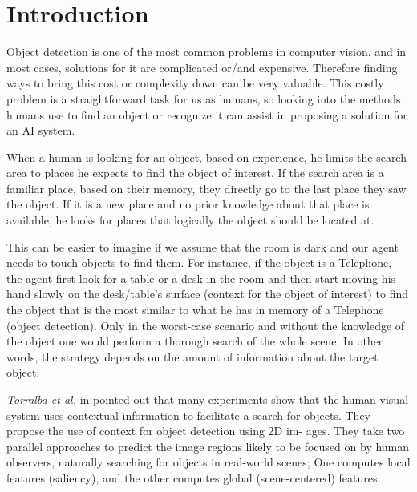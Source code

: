 \chapter{Introduction}
\label{Introduction.ch}
 Object detection is one of the most common problems in computer vision, and in
most cases, solutions for it are complicated or/and expensive. Therefore finding
ways to bring this cost or complexity down can be very valuable. This costly
problem is a straightforward task for us as humans, so looking into the methods
humans use to find an object or recognize it can assist in proposing a solution
for an AI system.
 
When a human is looking for an object, based on experience, he limits the
search area to places he expects to find the object of interest. If the search
area is a familiar place, based on their memory, they directly go to the last place
they saw the object. If it is a new place and no prior knowledge about that place
is available, he looks for places that logically the object should be located at.

This can be easier to imagine if we assume that the room is dark and our
agent needs to touch objects to find them. For instance, if the object is a Telephone, the agent first look for a table or a desk in the room and then start
moving his hand slowly on the desk/table's surface (context for the object of
interest) to find the object that is the most similar to what he has in memory of
a Telephone (object detection). Only in the worst-case scenario and without the
knowledge of the object one would perform a thorough search of the whole
scene. In other words, the strategy depends on the amount of information about
the target object.



{\it Torralba et al.} in \cite{eyeMovement} pointed out that many experiments show
that the human visual system uses contextual information to facilitate a search
for objects. They propose the use of context for object detection using 2D im-
ages. They take two parallel approaches to predict the image regions likely to
be focused on by human observers, naturally searching for objects in real-world
scenes; One computes local features (saliency), and the other computes global
(scene-centered) features.

